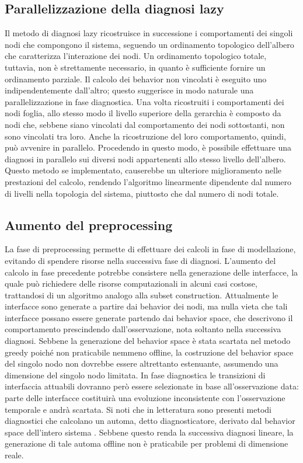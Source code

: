 \subsection{Parallelizzazione della diagnosi lazy}
Il metodo di diagnosi lazy ricostruisce in successione i comportamenti dei singoli nodi che compongono il sistema, seguendo un ordinamento topologico dell'albero che caratterizza l'interazione dei nodi. Un ordinamento topologico totale, tuttavia, non è strettamente necessario, in quanto è sufficiente fornire un ordinamento parziale. Il calcolo dei behavior non vincolati è eseguito uno indipendentemente dall'altro; questo suggerisce in modo naturale una parallelizzazione in fase diagnostica. Una volta ricostruiti i comportamenti dei nodi foglia, allo stesso modo il livello superiore della gerarchia è composto da nodi che, sebbene siano vincolati dal comportamento dei nodi sottostanti, non sono vincolati tra loro. Anche la ricostruzione del loro comportamento, quindi, può avvenire in parallelo. Procedendo in questo modo, è possibile effettuare una diagnosi in parallelo sui diversi nodi appartenenti allo stesso livello dell'albero. Questo metodo se implementato, causerebbe un ulteriore miglioramento nelle prestazioni del calcolo, rendendo l'algoritmo linearmente dipendente dal numero di livelli nella topologia del sistema, piuttosto che dal numero di nodi totale. 

\subsection{Aumento del preprocessing}
La fase di preprocessing permette di effettuare dei calcoli in fase di modellazione, evitando di spendere risorse nella successiva fase di diagnosi. L'aumento del calcolo in fase precedente potrebbe consistere nella generazione delle interfacce, la quale può richiedere delle risorse computazionali in alcuni casi costose, trattandosi di un algoritmo analogo alla subset construction. Attualmente le interfacce sono generate a partire dai behavior dei nodi, ma nulla vieta che tali interfacce possano essere generate partendo dai behavior space, che descrivono il comportamento prescindendo dall'osservazione, nota soltanto nella successiva diagnosi. Sebbene la generazione del behavior space è stata scartata nel metodo greedy poiché non praticabile nemmeno offline, la costruzione del behavior space del singolo nodo non dovrebbe essere altrettanto estenuante, assumendo una dimensione del singolo nodo limitata. In fase diagnostica le transizioni di interfaccia attuabili dovranno però essere selezionate in base all'osservazione data: parte delle interfacce costituirà una evoluzione inconsistente con l'osservazione temporale e andrà scartata. Si noti che in letteratura sono presenti metodi diagnostici che calcolano un automa, detto diagnosticatore, derivato dal behavior space dell'intero sistema \cite{SamSenLafSinTen:95,SamSenLafSinTen:96}. Sebbene questo renda la successiva diagnosi lineare, la generazione di tale automa offline non è praticabile per problemi di dimensione reale.


